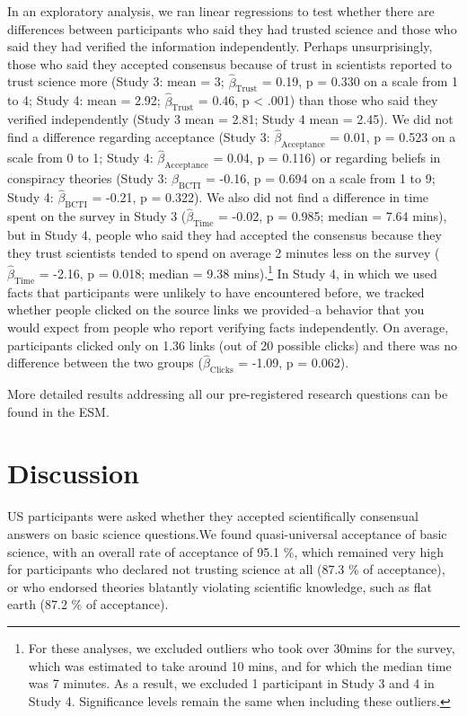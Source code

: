 \documentclass[
  doc,floatsintext]{apa6}
\begin{document}
In an exploratory analysis, we ran linear regressions to test whether there are differences between participants who said they had trusted science and those who said they had verified the information independently. Perhaps unsurprisingly, those who said they accepted consensus because of trust in scientists reported to trust science more (Study 3: mean = 3; \(\hat{\beta}_{\text{Trust}}\) = 0.19, p = 0.330 on a scale from 1 to 4; Study 4: mean = 2.92; \(\hat{\beta}_{\text{Trust}}\) = 0.46, p \textless{} .001) than those who said they verified independently (Study 3 mean = 2.81; Study 4 mean = 2.45). We did not find a difference regarding acceptance (Study 3: \(\hat{\beta}_{\text{Acceptance}}\) = 0.01, p = 0.523 on a scale from 0 to 1; Study 4: \(\hat{\beta}_{\text{Acceptance}}\) = 0.04, p = 0.116) or regarding beliefs in conspiracy theories (Study 3: \(\hat{\beta}_{\text{BCTI}}\) = -0.16, p = 0.694 on a scale from 1 to 9; Study 4: \(\hat{\beta}_{\text{BCTI}}\) = -0.21, p = 0.322). We also did not find a difference in time spent on the survey in Study 3 (\(\hat{\beta}_{\text{Time}}\) = -0.02, p = 0.985; median = 7.64 mins), but in Study 4, people who said they had accepted the consensus because they they trust scientists tended to spend on average 2 minutes less on the survey (\(\hat{\beta}_{\text{Time}}\) = -2.16, p = 0.018; median = 9.38 mins).\footnote{For these analyses, we excluded outliers who took over 30mins for the survey, which was estimated to take around 10 mins, and for which the median time was 7 minutes. As a result, we excluded 1 participant in Study 3 and 4 in Study 4. Significance levels remain the same when including these outliers.} In Study 4, in which we used facts that participants were unlikely to have encountered before, we tracked whether people clicked on the source links we provided--a behavior that you would expect from people who report verifying facts independently. On average, participants clicked only on 1.36 links (out of 20 possible clicks) and there was no difference between the two groups (\(\hat{\beta}_{\text{Clicks}}\) = -1.09, p = 0.062).

More detailed results addressing all our pre-registered research questions can be found in the ESM.

\section{Discussion}\label{discussion}

US participants were asked whether they accepted scientifically consensual answers on basic science questions.We found quasi-universal acceptance of basic science, with an overall rate of acceptance of 95.1 \%, which remained very high for participants who declared not trusting science at all (87.3 \% of acceptance), or who endorsed theories blatantly violating scientific knowledge, such as flat earth (87.2 \% of acceptance).
\end{document}
